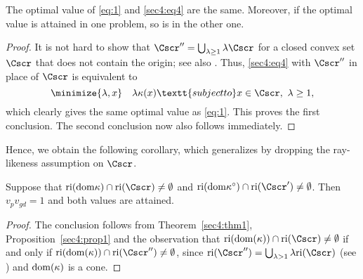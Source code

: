 \documentclass{siamltex}   %
\begin{document}
  \begin{proposition}\label{sec4:prop1}
    The optimal value of \eqref{eq:1} and \eqref{sec4:eq4} are the same. Moreover, if
    the optimal value is attained in one problem, so is in the other one.
  \end{proposition}
  \begin{proof}
    It is not hard to show that $\Cscr'' = \bigcup_{\lambda \ge 1}\lambda \Cscr$ for a closed convex set $\Cscr$ that does not contain the origin;
    see also \cite[Page~176]{McLinden:1978}. Thus,
    \eqref{sec4:eq4} with $\Cscr''$ in place of $\Cscr$ is equivalent to
    \begin{equation}\label{sec4:primal2}
      \minimize{\lambda,x} \quad \lambda\kappa(x) \textt{subject to} x\in\Cscr,\ \lambda\ge 1,
    \end{equation}
    which clearly gives the same optimal value as \eqref{eq:1}. This proves the first conclusion.
    The second conclusion now also follows immediately.
  \end{proof}

  Hence, we obtain the following corollary, which generalizes \cite[Theorem~2A]{freund:1987} by dropping the ray-likeness assumption
  on $\Cscr$.
  \begin{corollary}
    Suppose that ${\rm ri}({\rm dom}\kappa)\cap {\rm ri}(\Cscr)\neq \emptyset$ and ${\rm ri}({\rm dom}\kappa^\circ)\cap {\rm ri}(\Cscr')\neq \emptyset$.
    Then $v_pv_{gd}=1$ and both values are attained.
  \end{corollary}
  \begin{proof}
    The conclusion follows from Theorem~\ref{sec4:thm1}, Proposition~\ref{sec4:prop1}
    and the observation that ${\rm ri}({\rm dom}(\kappa))\cap {\rm ri}(\Cscr)\neq \emptyset$
    if and only if ${\rm ri}({\rm dom}(\kappa))\cap {\rm ri}(\Cscr'')\neq \emptyset$, since
    ${\rm ri}(\Cscr'') = \bigcup_{\lambda > 1}\lambda {\rm ri}(\Cscr)$ (see \cite[Page~50]{Roc70})
    and ${\rm dom}(\kappa)$ is a cone.
  \end{proof}
\end{document}
